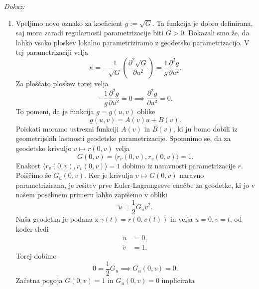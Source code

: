 \noindent
{\em Dokaz:\/}
\begin{enumerate}
    \item Vpeljimo novo oznako za koeficient $g := \sqrt{G}$. Ta funkcija je dobro definirana, saj mora zaradi regularnosti parametrizacije biti $G > 0$. Dokazali smo že, da lahko vsako ploskev lokalno parametriziramo z geodetsko parametrizacijo. V tej parametrizaciji velja \begin{equation*}
        \kappa = - \frac{1}{\sqrt{G}} \left( \frac{ \partial^{2} \sqrt{G}  }{ \partial u^{2} }  \right) = \frac{1}{g} \frac{ \partial^{2} g }{ \partial u^{2} } .
        \end{equation*}  
        Za ploščato ploskev torej velja \begin{equation*}
        -\frac{1}{g} \frac{ \partial^{2} g }{ \partial u^{2} } = 0 \implies \frac{ \partial^{2} g }{ \partial u^{2} } = 0. 
        \end{equation*}
        To pomeni, da je funkcija $g = g(u,v)$ oblike \begin{equation*}
        g(u,v) = A(v) u + B(v).
        \end{equation*}  
        Poiskati moramo ustrezni funkciji $A(v)$ in $B(v)$, ki ju bomo dobili iz geometrijskih lastnosti geodetske parametrizacije. Spomnimo se, da za
        geodetsko krivuljo $v \mapsto r(0,v)$ velja \begin{equation*}
        G(0, v) = \langle r_v(0,v), r_v(0,v) \rangle = 1. 
        \end{equation*}  
        Enakost $\langle r_v(0,v), r_v(0,v) \rangle = 1$ dobimo iz naravnosti parametrizacije $r$. Poiščimo še $G_u(0, v)$. Ker je krivulja
        $v \mapsto  G(0, v)$ naravno parametrizirana, je rešitev prve Euler-Lagrangeeve enačbe za geodetke, ki jo v našem posebnem primeru lahko zapišemo v obliki \begin{equation*}
        \ddot{u} = \frac{1}{2} G_u \dot{v}^2. 
        \end{equation*}  
        Naša geodetka je podana z $\gamma(t) = r(0, v(t))$ in velja $u = 0, v = t$, od koder sledi \begin{align*}
            \ddot{u} &= 0, \\
            \dot{v} &= 1.
        \end{align*}
        Torej dobimo \begin{equation*}
        0 = \frac{1}{2} G_u \implies G_u(0,v) = 0.
        \end{equation*}  
        Začetna pogoja $G(0, v) = 1$ in $G_u(0,v) = 0$ implicirata \begin{align*}

\end{align*}
\end{enumerate}
